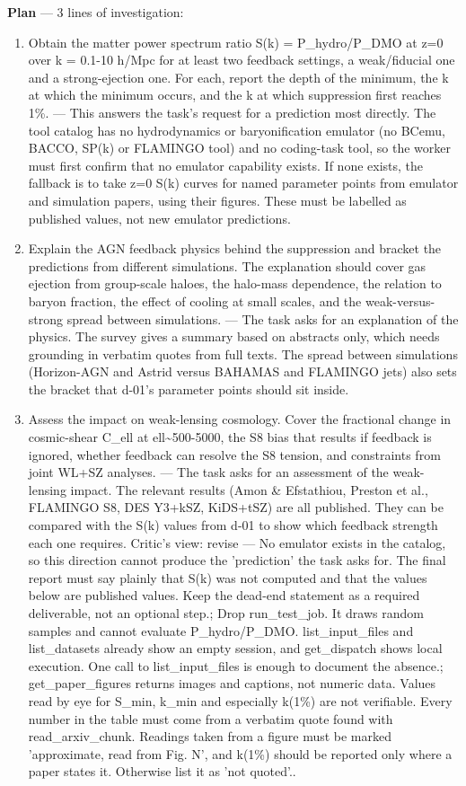 \documentclass[11pt,a4paper]{article}
\begin{document}
\textbf{Plan} --- 3 lines of investigation:

\begin{enumerate}
  \item Obtain the matter power spectrum ratio S(k) = P\_hydro/P\_DMO at z=0 over k = 0.1-10 h/Mpc for at least two feedback settings, a weak/fiducial one and a strong-ejection one. For each, report the depth of the minimum, the k at which the minimum occurs, and the k at which suppression first reaches 1\%. --- This answers the task's request for a prediction most directly. The tool catalog has no hydrodynamics or baryonification emulator (no BCemu, BACCO, SP(k) or FLAMINGO tool) and no coding-task tool, so the worker must first confirm that no emulator capability exists. If none exists, the fallback is to take z=0 S(k) curves for named parameter points from emulator and simulation papers, using their figures. These must be labelled as published values, not new emulator predictions.
  \item Explain the AGN feedback physics behind the suppression and bracket the predictions from different simulations. The explanation should cover gas ejection from group-scale haloes, the halo-mass dependence, the relation to baryon fraction, the effect of cooling at small scales, and the weak-versus-strong spread between simulations. --- The task asks for an explanation of the physics. The survey gives a summary based on abstracts only, which needs grounding in verbatim quotes from full texts. The spread between simulations (Horizon-AGN and Astrid versus BAHAMAS and FLAMINGO jets) also sets the bracket that d-01's parameter points should sit inside.
  \item Assess the impact on weak-lensing cosmology. Cover the fractional change in cosmic-shear C\_ell at ell\textasciitilde{}500-5000, the S8 bias that results if feedback is ignored, whether feedback can resolve the S8 tension, and constraints from joint WL+SZ analyses. --- The task asks for an assessment of the weak-lensing impact. The relevant results (Amon \& Efstathiou, Preston et al., FLAMINGO S8, DES Y3+kSZ, KiDS+tSZ) are all published. They can be compared with the S(k) values from d-01 to show which feedback strength each one requires.
Critic's view: revise --- No emulator exists in the catalog, so this direction cannot produce the 'prediction' the task asks for. The final report must say plainly that S(k) was not computed and that the values below are published values. Keep the dead-end statement as a required deliverable, not an optional step.; Drop run\_test\_job. It draws random samples and cannot evaluate P\_hydro/P\_DMO. list\_input\_files and list\_datasets already show an empty session, and get\_dispatch shows local execution. One call to list\_input\_files is enough to document the absence.; get\_paper\_figures returns images and captions, not numeric data. Values read by eye for S\_min, k\_min and especially k(1\%) are not verifiable. Every number in the table must come from a verbatim quote found with read\_arxiv\_chunk. Readings taken from a figure must be marked 'approximate, read from Fig. N', and k(1\%) should be reported only where a paper states it. Otherwise list it as 'not quoted'..

\end{enumerate}
\end{document}
